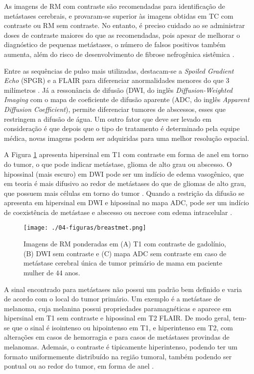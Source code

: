 As imagens de RM com contraste são recomendadas para identificação de metástases cerebrais, e provaram-se superior às imagens obtidas em TC com contraste ou RM sem contraste. No entanto, é preciso cuidado ao se administrar doses de contraste maiores do que as recomendadas, pois apesar de melhorar o diagnóstico de pequenas metástases, o número de falsos positivos também aumenta, além do risco de desenvolvimento de fibrose nefrogênica sistêmica \cite{Zakaria:2014}.

Entre as sequências de pulso mais utilizadas, destacam-se a \textit{Spoiled Gradient Echo} (SPGR) e a FLAIR para diferenciar anormalidades menores do que 3 milímetros \cite{Zakaria:2014}. Já a ressonância de difusão (DWI, do inglês \textit{Diffusion-Weighted Imaging} com o mapa de coeficiente de difusão aparente (ADC, do inglês \textit{Apparent Diffusion Coefficient}), permite diferenciar tumores de abscessos, esses que restringem a difusão de água. Um outro fator que deve ser levado em consideração é que depois que o tipo de tratamento é determinado pela equipe médica, novas imagens podem ser adquiridas para uma melhor resolução espacial.

A Figura \ref{fig:breastmet} apresenta hipersinal em T1 com contraste em forma de anel em torno do tumor, o que pode indicar metástase, glioma de alto grau ou abscesso. O hipossinal (mais escuro) em DWI pode ser um indício de edema vasogênico, que em teoria é mais difusivo ao redor de metástases do que de gliomas de alto grau, que possuem mais células em torno do tumor \cite{Zakaria:2014}. Quando a restrição da difusão se apresenta em hipersinal em DWI e hipossinal no mapa ADC, pode ser um indício de coexistência de metástase e abscesso ou necrose com edema intracelular \cite{Yousef:2014}. 

\begin{figure}[!htb]
\centering
    \texttt{[image: ./04-figuras/breastmet.png]}
	\caption{Imagens de RM ponderadas em (A) T1 com contraste de gadolínio, (B) DWI sem contraste e (C) mapa ADC sem contraste em caso de metástase cerebral única de tumor primário de mama em paciente mulher de 44 anos.}\vspace{-0.2cm}
    \label{fig:breastmet}
\end{figure}

A sinal encontrado para metástases não possui um padrão bem definido \cite{Zakaria:2014,Yousef:2014} e varia de acordo com o local do tumor primário. Um exemplo é a metástase de melanoma, cuja melanina possui propriedades paramagnéticas e aparece em hipersinal em T1 sem contraste e hipossinal em T2 FLAIR. De modo geral, tem-se que o sinal é isointenso ou hipointenso em T1, e hiperintenso em T2, com alterações em casos de hemorragia e para casos de metástases provindas de melanomas. Ademais, o contraste é tipicamente hiperintenso, podendo ter um formato uniformemente distribuído na região tumoral, também podendo ser pontual ou ao redor do tumor, em forma de anel \cite{Fink:2013}.

